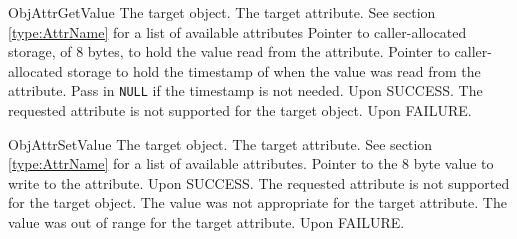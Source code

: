 %
\begin{prototype}{ObjAttrGetValue}
		{\pInput}	{The target object.}
		{\pInput}	{The target attribute. See section \ref{type:AttrName} for a list of available attributes}
			{\pOutput}	{Pointer to caller-allocated storage, of 8 bytes, to hold the value read from the attribute.}
		{\pOutput}	{Pointer to caller-allocated storage to hold the timestamp of when the value was read from the attribute. Pass in \texttt{NULL} if the timestamp is not needed.}
	 			{Upon SUCCESS.}
	 		{The requested attribute is not supported for the target object.}
	 			{Upon FAILURE.}
\end{prototype}
\begin{prototype}{ObjAttrSetValue}
		{\pInput}	{The target object.}
		{\pInput}	{The target attribute. See section \ref{type:AttrName} for a list of available attributes.}
		{\pInput}	{Pointer to the 8 byte value to write to the attribute.}
	 			{Upon SUCCESS.}
	 		{The requested attribute is not supported for the target object.}
	 			{The value was not appropriate for the target attribute.}
	 		{The value was out of range for the target attribute.}
	 			{Upon FAILURE.}
\end{prototype}
